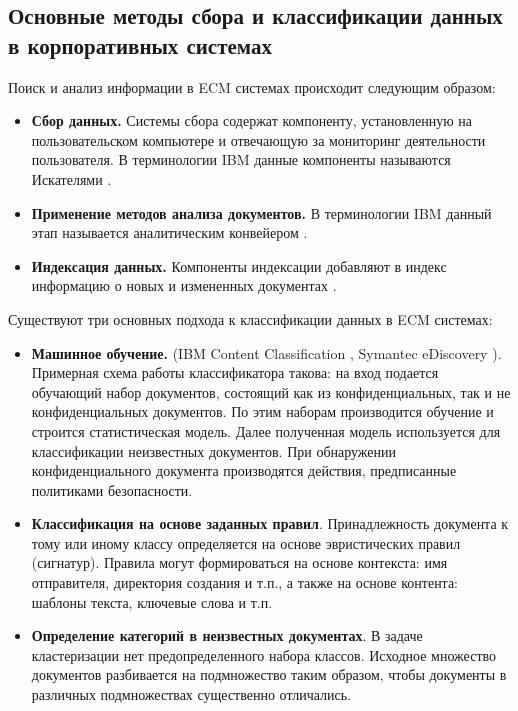 \documentclass[russian, utf8, emptystyle]{eskdtext}
\begin{document}
\subsection{Основные методы сбора и классификации данных в корпоративных системах}
Поиск и анализ информации в ECM системах происходит следующим образом:
\begin{itemize}
	\item {\bf Сбор данных.} Системы сбора содержат компоненту, установленную на пользовательском компьютере и отвечающую за мониторинг деятельности пользователя. В терминологии IBM данные компоненты называются Искателями \cite{searcher}.
	\item {\bf Применение методов анализа документов.} В терминологии IBM данный этап называется аналитическим конвейером \cite{analitic}.
	\item {\bf Индексация данных.} Компоненты индексации добавляют в индекс информацию о новых и измененных документах
	\cite{idx1,idx2,idx3}.
\end{itemize}

Существуют три основных подхода к классификации данных в ECM системах:
\begin{itemize}
	\item {\bf Машинное обучение.} (IBM Content Classification \cite{ContentClassification}, Symantec eDiscovery \cite{Symantec}). Примерная схема работы классификатора такова: на вход подается обучающий набор документов, состоящий как из конфиденциальных, так и не конфиденциальных документов. По этим наборам производится обучение и строится статистическая модель. Далее полученная модель используется для классификации неизвестных документов. При обнаружении конфиденциального документа производятся действия, предписанные политиками безопасности.
	\item {\bf Классификация на основе заданных правил}. Принадлежность документа к тому или иному классу определяется на основе эвристических правил (сигнатур). Правила могут формироваться на основе контекста: имя отправителя, директория создания и т.п., а также на основе контента: шаблоны текста, ключевые слова и т.п. 
	\item {\bf Определение категорий в неизвестных документах}.
	В задаче кластеризации нет предопределенного набора классов. Исходное множество документов разбивается на подмножество таким образом, чтобы документы в различных подмножествах существенно отличались.
\end{itemize}
\end{document}
